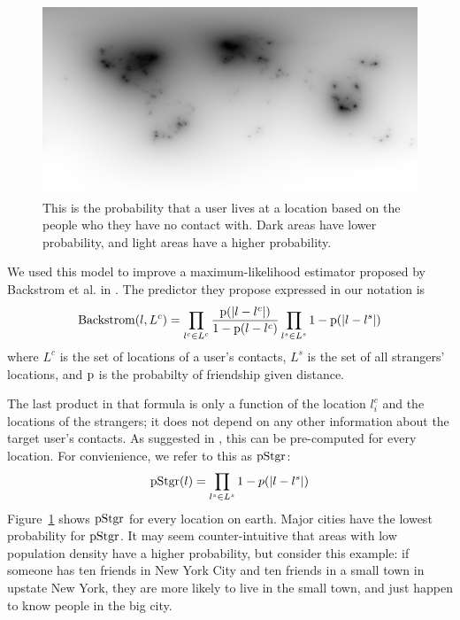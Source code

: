 \begin{figure}[tbh]
\centering
\includegraphics[width=\linewidth]{figures/stranger_mat.png}
\caption{
    This is the probability that a user lives at a location based on the people
    who they have no contact with. Dark areas have lower probability, and light
    areas have a higher probability.
%
}
\label{fig:StrangerMat}
\end{figure}


We used this model to improve a maximum-likelihood estimator proposed by
Backstrom et al. in \cite{backstrom2010find}.
%
The predictor they propose expressed in our notation is
\[
    \operatorname{Backstrom}(l,L^c) = 
        \prod_{l^c \in L^c} {\operatorname{p}(|l-l^c|) \over 1-\operatorname{p}(l-l^c) }
        \prod_{l^s \in L^s} 1-\operatorname{p}(|l-l^s|)
\]
where $L^c$ is the set of locations of a user's contacts, $L^s$ is the set
of all strangers' locations, and $\operatorname{p}$ is the probabilty of friendship given
distance.

The last product in that formula is only a function of the location $l^c_i$ and
the locations of the strangers; it does not depend on any other information
about the target user's contacts.
%
As suggested in \cite{backstrom2010find}, this can be pre-computed for every
location.
%
For convienience, we refer to this as $\operatorname{pStgr}$:
\[
    \operatorname{pStgr}(l) = \prod_{l^s \in L^s}1-p(|l-l^s|)
\]
Figure~\ref{fig:StrangerMat} shows $\operatorname{pStgr}$ for every location on earth.
%
Major cities have the lowest probability for $\operatorname{pStgr}$.
%
It may seem counter-intuitive that areas with low population density have a
higher probability, but consider this example: if someone has ten friends in
New York City and ten friends in a small town in upstate New York, they are
more likely to live in the small town, and just happen to know people in the
big city.

